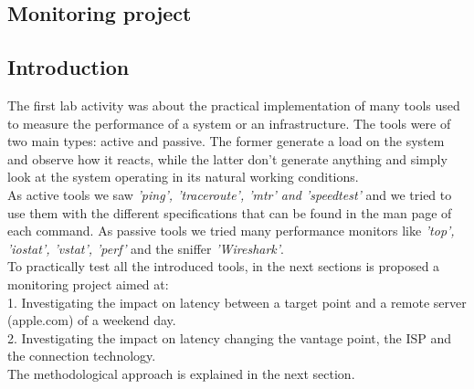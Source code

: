 \documentclass[a4paper,10pt]{article}
\begin{document}
\begin{multicols}{2}

\clearpage

\setcounter{page}{1}

\section{Monitoring project}




\subsection{Introduction}

The first lab activity was about the practical implementation of many tools used to measure the performance of a system or an 
infrastructure. The tools were of two main types: active and passive. The former generate a load on the system and observe how it reacts, while the latter don't generate anything and simply
look at the system operating in its natural working conditions.\\
As active tools we saw \textit{'ping', 'traceroute', 'mtr' and 'speedtest'} and we tried to use them with the different specifications 
that can be found in the man page of each command. As passive tools we tried many performance monitors 
like \textit{'top', 'iostat', 'vstat', 'perf'} and the sniffer \textit{'Wireshark'}.\\
To practically test all the introduced tools, in the next sections is proposed a monitoring project aimed at:\\
1. Investigating the impact on latency between a target point and a remote server (apple.com) of a weekend day.\\
2. Investigating the impact on latency changing the vantage point, the ISP and the connection technology.\\ 
The methodological approach is explained in the next section.





\end{multicols}
\end{document}
